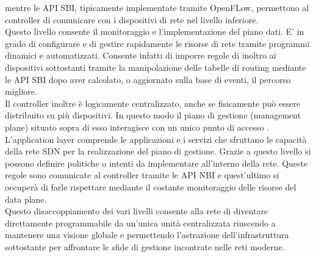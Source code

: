 mentre le API SBI, tipicamente implementate tramite OpenFLow, permettono al controller di comunicare con i dispositivi di rete nel livello inferiore.
\\Questo livello consente il monitoraggio e l'implementazione del piano
dati. E' in grado di configurare e di gestire rapidamente le risorse di rete tramite programmi dinamici e automatizzati. Consente infatti di imporre regole di
inoltro ai dispositivi sottostanti tramite la manipolazione delle tabelle di routing mediante le API SBI dopo aver calcolato, o aggiornato sulla base di eventi, il percorso migliore.
\\Il controller inoltre è logicamente centralizzato, anche se fisicamente può essere distribuito su più dispositivi. In questo modo il piano di gestione (management plane) situato sopra di esso interagisce con un
unico punto di accesso \cite{tesiSDN:2020}.
\\L'application layer comprende le applicazioni e i servizi che sfruttano le capacità della
rete SDN per la realizzazione del piano di gestione. Grazie a questo livello si possono
definire politiche o intenti da implementare all'interno della rete. Queste regole sono comunicate al
controller tramite le API NBI e quest'ultimo si occuperà di farle rispettare mediante il costante monitoraggio delle risorse del data plane. 
\\Questo disaccoppiamento dei vari livelli consente alla rete di diventare direttamente programmabile da un'unica unità
centralizzata riuscendo a mantenere una visione globale e permettendo l'astrazione dell'infrastruttura sottostante per affrontare le sfide 
di gestione incontrate nelle reti moderne.

